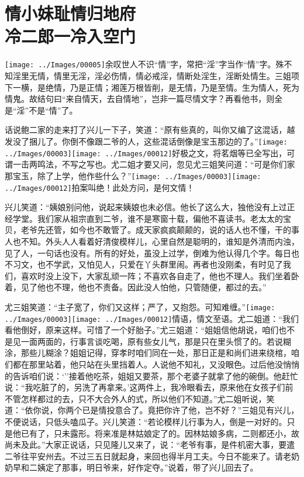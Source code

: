 
\chapter{情小妹耻情归地府\\冷二郎一冷入空门}

{\texttt{[image: ../Images/00005]}\kaishu 余叹世人不识``情''字，常把``淫''字当作``情''字。殊不知淫里无情，情里无淫，淫必伤情，情必戒淫，情断处淫生，淫断处情生。三姐项下一横，是绝情，乃是正情；湘莲万根皆削，是无情，乃是至情。生为情人，死为情鬼。故结句曰``来自情天，去自情地''，岂非一篇尽情文字？再看他书，则全是``淫''不是``情''了。}

话说鲍二家的走来打了兴儿一下子，笑道：``原有些真的，叫你又编了这混话，越发没了捆儿了。你倒不像跟二爷的人，这些混话倒像是宝玉那边的了。''{\texttt{[image: ../Images/00003]}\texttt{[image: ../Images/00012]}\footnotesize \kaishu 好极之文，将茗烟等已全写出，可谓一击两鸣法，不写之写也。}尤二姐才要又问，忽见尤三姐笑问道：``可是你们家那宝玉，除了上学，他作些什么？''{\texttt{[image: ../Images/00003]}\texttt{[image: ../Images/00012]}\footnotesize \kaishu 拍案叫绝！此处方问，是何文情！}

兴儿笑道：``姨娘别问他，说起来姨娘也未必信。他长了这么大，独他没有上过正经学堂。我们家从祖宗直到二爷，谁不是寒窗十载，偏他不喜读书。老太太的宝贝，老爷先还管，如今也不敢管了。成天家疯疯颠颠的，说的话人也不懂，干的事人也不知。外头人人看着好清俊模样儿，心里自然是聪明的，谁知是外清而内浊，见了人，一句话也没有。所有的好处，虽没上过学，倒难为他认得几个字。每日也不习文，也不学武，又怕见人，只爱在丫头群里闹。再者也没刚柔，有时见了我们，喜欢时没上没下，大家乱顽一阵；不喜欢各自走了，他也不理人。我们坐着卧着，见了他也不理，他也不责备。因此没人怕他，只管随便，都过的去。''

尤三姐笑道：``主子宽了，你们又这样；严了，又抱怨。可知难缠。''{\texttt{[image: ../Images/00003]}\texttt{[image: ../Images/00012]}\footnotesize \kaishu 情语，情文至语。}尤二姐道：``我们看他倒好，原来这样。可惜了一个好胎子。''尤三姐道：``姐姐信他胡说，咱们也不是见一面两面的，行事言谈吃喝，原有些女儿气，那是只在里头惯了的。若说糊涂，那些儿糊涂？姐姐记得，穿孝时咱们同在一处，那日正是和尚们进来绕棺，咱们都在那里站着，他只站在头里挡着人。人说他不知礼，又没眼色。过后他没悄悄的告诉咱们说：`''接着他吃茶，姐姐又要茶，那个老婆子就拿了他的碗倒。他赶忙说：``我吃脏了的，另洗了再拿来。'这两件上，我冷眼看去，原来他在女孩子们前不管怎样都过的去，只不大合外人的式，所以他们不知道。''尤二姐听说，笑道：``依你说，你两个已是情投意合了。竟把你许了他，岂不好？''三姐见有兴儿，不便说话，只低头嗑瓜子。兴儿笑道：``若论模样儿行事为人，倒是一对好的。只是他已有了，只未露形。将来准是林姑娘定了的。因林姑娘多病，二则都还小，故尚未及此。''大家正说话，只见隆儿又来了，说：``老爷有事，是件机密大事，要遣二爷往平安州去。不过三五日就起身，来回也得半月工夫。今日不能来了。请老奶奶早和二姨定了那事，明日爷来，好作定夺。''说着，带了兴儿回去了。

